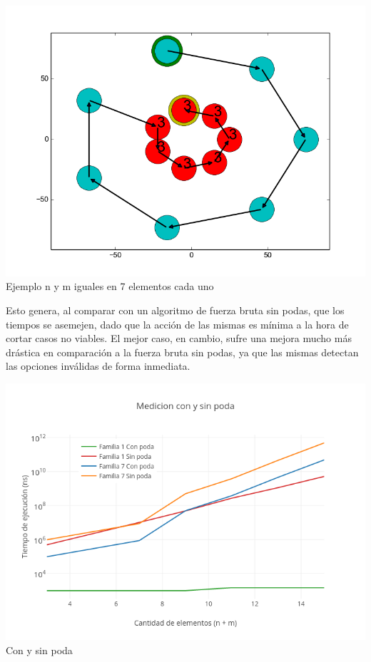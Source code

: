 \vspace*{0.3cm} \vspace*{0.3cm}
  \begin{center}
 \includegraphics[scale=0.6]{./EJ1/anilloexacto.png}
 {\\Ejemplo n y m iguales en 7 elementos cada uno}
  \end{center}
  \vspace*{0.3cm}

Esto genera, al comparar con un algoritmo de fuerza bruta sin podas, que los tiempos se asemejen, dado que la acción de las mismas es mínima a la hora de cortar casos no viables. El mejor caso, en cambio, sufre una mejora mucho más drástica en comparación a la fuerza bruta sin podas, ya que las mismas detectan las opciones inválidas de forma inmediata.

\vspace*{0.3cm} \vspace*{0.3cm}
  \begin{center}
 \includegraphics[scale=0.6]{./EJ1/fuerzabruta.png}
 {\\Con y sin poda}
  \end{center}
  \vspace*{0.3cm}

